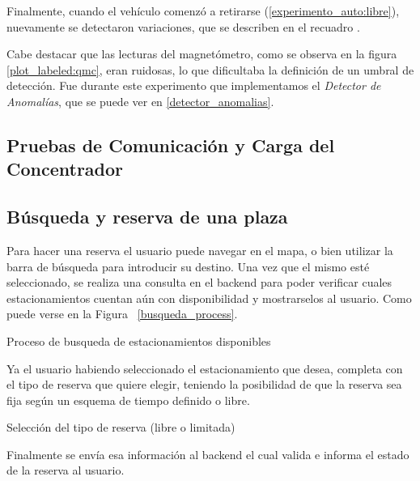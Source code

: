Finalmente, cuando el vehículo comenzó a retirarse (\ref{experimento_auto:libre}), nuevamente se detectaron variaciones, que se describen en el recuadro .

Cabe destacar que las lecturas del magnetómetro, como se observa en la figura \ref{plot_labeled:qmc}, eran ruidosas, lo que dificultaba la definición de un umbral de detección. Fue durante este experimento que implementamos el \textit{Detector de Anomalías}, que se puede ver en \ref{detector_anomalias}.


\subsection{Pruebas de Comunicación y Carga del Concentrador}\label{title:cx_load_concentrador}



\subsection{Búsqueda y reserva de una plaza}
Para hacer una reserva el usuario puede navegar en el mapa, o bien utilizar la barra de búsqueda para introducir su destino. Una vez que el mismo esté seleccionado, se realiza una consulta en el backend para poder verificar cuales estacionamientos cuentan aún con disponibilidad y mostrarselos al usuario. Como puede verse en la Figura ~\ref{busqueda_process}.

\begin{images}[\label{busqueda_process}]{Proceso de busqueda de estacionamientos disponibles}
\end{images}

Ya el usuario habiendo seleccionado el estacionamiento que desea, completa con el tipo de reserva que quiere elegir, teniendo la posibilidad de que la reserva sea fija según un esquema de tiempo definido o libre.

\begin{images}[\label{reserva_process}]{Selección del tipo de reserva (libre o limitada)}
\end{images}

Finalmente se envía esa información al backend el cual valida e informa el estado de la reserva al usuario.

